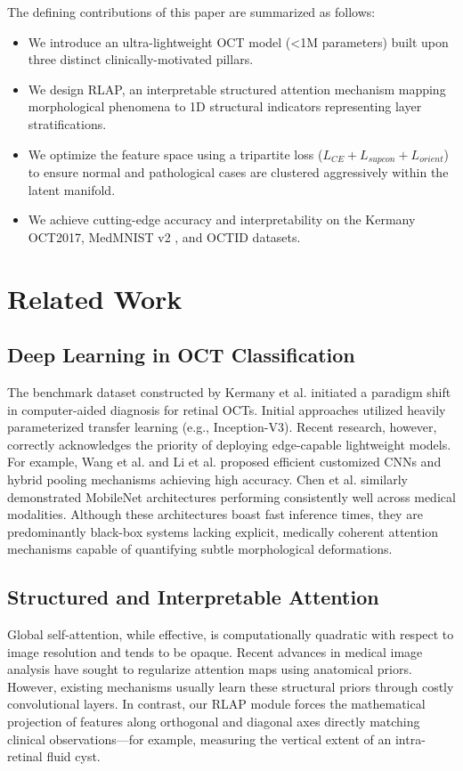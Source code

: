 \documentclass[journal]{IEEEtran}
\begin{document}
The defining contributions of this paper are summarized as follows:
\begin{itemize}
    \item We introduce an ultra-lightweight OCT model (<1M parameters) built upon three distinct clinically-motivated pillars.
    \item We design RLAP, an interpretable structured attention mechanism mapping morphological phenomena to 1D structural indicators representing layer stratifications.
    \item We optimize the feature space using a tripartite loss ($L_{CE} + L_{supcon} + L_{orient}$) to ensure normal and pathological cases are clustered aggressively within the latent manifold.
    \item We achieve cutting-edge accuracy and interpretability on the Kermany OCT2017, MedMNIST v2 \cite{medmnistv2}, and OCTID datasets.
\end{itemize}

\section{Related Work}
\subsection{Deep Learning in OCT Classification}
The benchmark dataset constructed by Kermany et al. \cite{kermany2018identifying} initiated a paradigm shift in computer-aided diagnosis for retinal OCTs. Initial approaches utilized heavily parameterized transfer learning (e.g., Inception-V3). Recent research, however, correctly acknowledges the priority of deploying edge-capable lightweight models. For example, Wang et al. \cite{wang2023lightweight} and Li et al. \cite{li2024hybrid} proposed efficient customized CNNs and hybrid pooling mechanisms achieving high accuracy. Chen et al. \cite{chen2023mobile} similarly demonstrated MobileNet architectures performing consistently well across medical modalities. Although these architectures boast fast inference times, they are predominantly black-box systems lacking explicit, medically coherent attention mechanisms capable of quantifying subtle morphological deformations. 

\subsection{Structured and Interpretable Attention}
Global self-attention, while effective, is computationally quadratic with respect to image resolution and tends to be opaque. Recent advances in medical image analysis have sought to regularize attention maps using anatomical priors. However, existing mechanisms usually learn these structural priors through costly convolutional layers. In contrast, our RLAP module forces the mathematical projection of features along orthogonal and diagonal axes directly matching clinical observations—for example, measuring the vertical extent of an intra-retinal fluid cyst.
\end{document}
